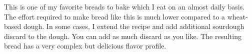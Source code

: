 This is one of my favorite breads to bake which I eat on an
almost daily basis. The effort required to make bread like
this is much lower compared to a wheat-based dough. In some
cases, I extend the recipe and add additional sourdough discard
to the dough. You can add as much discard as you like. The resulting
bread has a very complex but delicious flavor profile.
